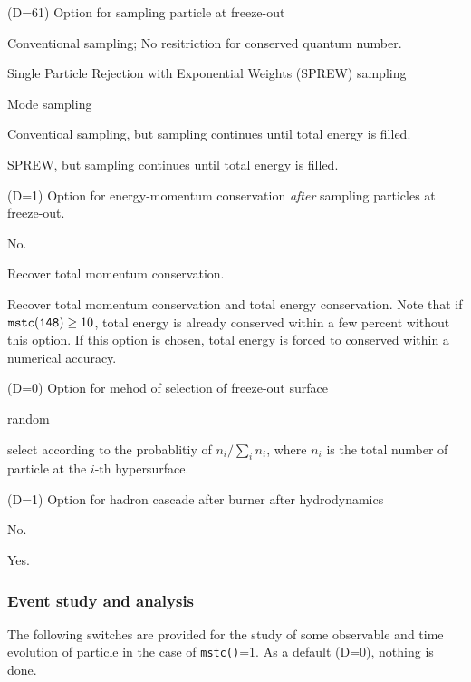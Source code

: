\documentclass[]{article}
\newenvironment{entry}%
{\begin{list}{}{\setlength{\topsep}{0mm} \setlength{\itemsep}{0mm}
\setlength{\parskip}{0mm} \setlength{\parsep}{0mm}
\setlength{\leftmargin}{20mm} \setlength{\rightmargin}{0mm}
\setlength{\labelwidth}{18mm} \setlength{\labelsep}{2mm}}}%
{\end{list}}
\newenvironment{subentry}%
{\begin{list}{}{\setlength{\topsep}{0mm} \setlength{\itemsep}{0mm}
\setlength{\parskip}{0mm} \setlength{\parsep}{0mm}
\setlength{\leftmargin}{10mm} \setlength{\rightmargin}{0mm}
\setlength{\labelwidth}{18mm} \setlength{\labelsep}{2mm}}}%
{\end{list}}
\newcommand{\ttt}[1]{{\tt#1}}
\newcommand{\itemt}[1]{\item[{\tt #1}\hfill]}
\newcommand{\comment}[1]{}
\begin{document}
\begin{entry}
\itemt{mstc(148) :}(D=61) Option for sampling particle at freeze-out
 \begin{subentry}
    \itemt{$=0$ :} Conventional sampling; 
      No resitriction for conserved quantum number.
    \itemt{$=2$ :} Single Particle Rejection with Exponential Weights
     (SPREW) sampling
    \itemt{$=10$ :} Mode sampling
    \itemt{$=11$ :} Conventioal sampling, but sampling continues until
    total energy is filled.
    \itemt{$=12$ :} SPREW, but sampling continues until
    total energy is filled.
 \end{subentry}
  
\itemt{mstc(149) :}(D=1) Option for energy-momentum conservation
  \textit{after}  sampling particles at freeze-out.
 \begin{subentry}
    \itemt{$=0$ :} No.
    \itemt{$=1$ :} Recover total momentum conservation.
    \itemt{$=2$ :} Recover total momentum conservation and 
    total energy conservation.
    Note that if $\ttt{mstc(148)} \geq 10$, total energy is already conserved
    within a few percent without this option.
    If this option is chosen, total energy is forced to
     conserved within a numerical accuracy.
 \end{subentry}

\itemt{mstc(150) :}(D=0) Option for mehod of selection of freeze-out surface
 \begin{subentry}
    \itemt{$=0$ :} random
    \itemt{$=1$ :} select according to the probablitiy of
      $n_i/\sum_i n_i$, where $n_i$ is the total number of particle
      at the $i$-th hypersurface.
 \end{subentry}

\itemt{mstc(151) :}(D=1) Option for hadron cascade after burner after hydrodynamics
 \begin{subentry}
    \itemt{$=0$ :} No.
    \itemt{$=1$ :} Yes.
 \end{subentry}

\medskip
\subsubsection*{ Event study and analysis}
The following switches are provided for the study of
some observable and time evolution of particle
in the case of \ttt{mstc()}=1.
As a default (D=0), nothing is done.
\comment{mstc(151): (D=0) not used (Nuclear cluster analysis)}


\end{entry}
\end{document}
